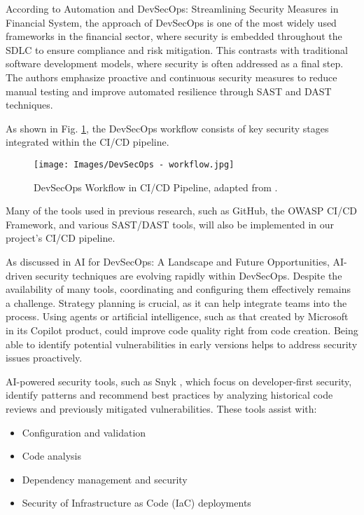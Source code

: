 \documentclass[conference]{IEEEtran}
\begin{document}
According to \cite{Kushwaha2024} Automation and DevSecOps: Streamlining Security Measures in Financial System, the approach of DevSecOps is one of the most widely used frameworks in the financial sector, where security is embedded throughout the SDLC to ensure compliance and risk mitigation. This contrasts with traditional software development models, where security is often addressed as a final step. The authors emphasize proactive and continuous security measures to reduce manual testing and improve automated resilience through SAST and DAST techniques.

As shown in Fig. \ref{fig:devsecopsworkflow}, the DevSecOps workflow consists of key security stages integrated within the CI/CD pipeline.

\begin{figure}[h!] 
    \centering 
    \texttt{[image: Images/DevSecOps - workflow.jpg]} 
    \caption{DevSecOps Workflow in CI/CD Pipeline, adapted from \cite{Kushwaha2024}.} 
    \label{fig:devsecopsworkflow} 
\end{figure}

Many of the tools used in previous research, such as GitHub, the OWASP CI/CD Framework, and various SAST/DAST tools, will also be implemented in our project’s CI/CD pipeline.

As discussed in \cite{Fu2024} AI for DevSecOps: A Landscape and Future Opportunities, AI-driven security techniques are evolving rapidly within DevSecOps. Despite the availability of many tools, coordinating and configuring them effectively remains a challenge. Strategy planning is crucial, as it can help integrate teams into the process. Using agents or artificial intelligence, such as that created by Microsoft in its Copilot product, could improve code quality right from code creation. Being able to identify potential vulnerabilities in early versions helps to address security issues proactively.

AI-powered security tools, such as Snyk \cite{Snyk2024}, which focus on developer-first security, identify patterns and recommend best practices by analyzing historical code reviews and previously mitigated vulnerabilities. These tools assist with:
\begin{itemize}
    \item Configuration and validation
    \item Code analysis
    \item Dependency management and security
    \item Security of Infrastructure as Code (IaC) deployments
\end{itemize}
\end{document}
